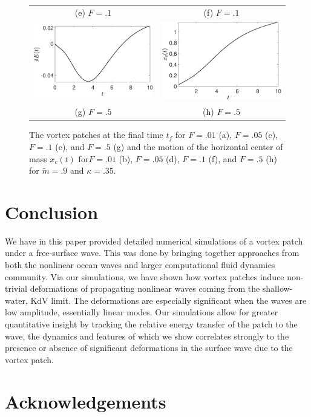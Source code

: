 \documentclass[a4paper,11pt]{article}
\begin{document}
\begin{figure}
\begin{tabular}{cc}
(e) $F=.1$ & (f) $F=.1$\\
 \includegraphics[width=.35\textwidth]{energy_wm_50_modu_pt9} & \includegraphics[width=.35\textwidth]{com_wm_50_modu_pt9}\\
(g) $F=.5$ & (h) $F=.5$
\end{tabular}
\caption{The vortex patches at the final time $t_{f}$ for $F=.01$ (a), $F=.05$ (c), $F=.1$ (e), and $F=.5$ (g) and the motion of the horizontal center of mass $x_{c}(t)$ for$F=.01$ (b), $F=.05$ (d), $F=.1$ (f), and $F=.5$ (h) for $\tilde{m}=.9$ and $\kappa = .35$.}
\label{fig:highsolvorticity}
\end{figure}


\section{Conclusion}
We have in this paper provided detailed numerical simulations of a vortex patch under a free-surface wave.  This was done by bringing together approaches from both the nonlinear ocean waves and larger computational fluid dynamics community.  Via our simulations, we have shown how vortex patches induce non-trivial deformations of propagating nonlinear waves coming from the shallow-water, KdV limit.  The deformations are especially significant when the waves are low amplitude, essentially linear modes.  Our simulations allow for greater quantitative insight by tracking the relative energy transfer of the patch to the wave, the dynamics and features of which we show correlates strongly to the presence or absence of significant deformations in the surface wave due to the vortex patch.  

\section*{Acknowledgements}
\end{document}

